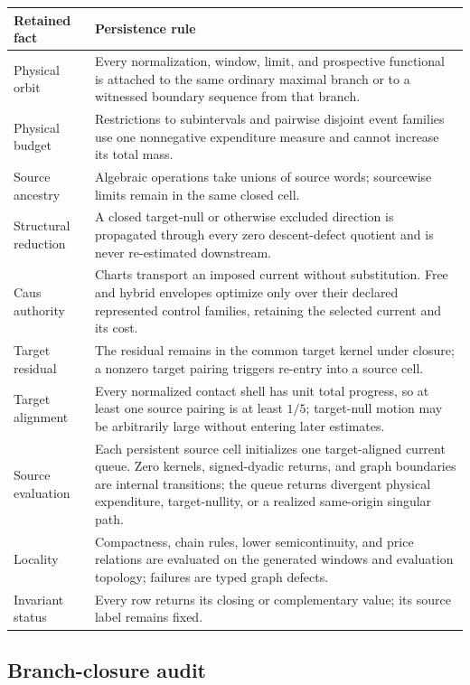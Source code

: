 \documentclass[11pt]{article}
\numberwithin{section}{part}
\theoremstyle{plain}
\theoremstyle{definition}
\theoremstyle{remark}
\begin{document}
\begin{longtable}{p{.25\linewidth}p{.65\linewidth}}
\toprule
Retained fact & Persistence rule\\
\midrule
Physical orbit & Every normalization, window, limit, and prospective
functional is attached to the same ordinary maximal branch or to a witnessed
boundary sequence from that branch.\\
Physical budget & Restrictions to subintervals and pairwise disjoint event
families use one nonnegative expenditure measure and cannot increase its total mass.\\
Source ancestry & Algebraic operations take unions of source words; sourcewise
limits remain in the same closed cell.\\
Structural reduction & A closed target-null or otherwise excluded direction is
propagated through every zero descent-defect quotient and is never re-estimated
downstream.\\
Caus authority & Charts transport an imposed current without substitution.
Free and hybrid envelopes optimize only over their declared represented
control families, retaining the selected current and its cost.\\
Target residual & The residual remains in the common target kernel under
closure; a nonzero target pairing triggers re-entry into a source cell.\\
Target alignment & Every normalized contact shell has unit total progress,
so at least one source pairing is at least \(1/5\); target-null motion may be
arbitrarily large without entering later estimates.\\
Source evaluation & Each persistent source cell initializes one target-aligned
current queue.  Zero kernels, signed-dyadic returns, and graph boundaries are
internal transitions; the queue returns divergent physical expenditure,
target-nullity, or a realized same-origin singular path.\\
Locality & Compactness, chain rules, lower semicontinuity, and price relations
are evaluated on the generated windows and evaluation topology; failures are
typed graph defects.\\
Invariant status & Every row returns its closing or complementary value; its
source label remains fixed.\\
\bottomrule
\end{longtable}

\subsection*{Branch-closure audit}
\end{document}
